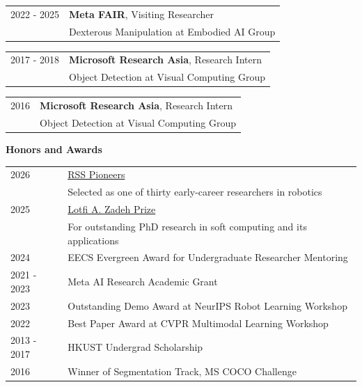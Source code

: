 \documentclass{resume}
\newlength{\myvertspace}
\newcommand{\vs}{ \vspace{\myvertspace} }
\begin{document}
{\renewcommand{\arraystretch}{1.1}
\begin{tabular}{@{}L{2.1cm}l@{}}
{2022 - 2025} & {\bf Meta FAIR}, Visiting Researcher \\
& {Dexterous Manipulation at Embodied AI Group} \\
\end{tabular}}

{\renewcommand{\arraystretch}{1.1}
\begin{tabular}{@{}L{2.1cm}l@{}}
{2017 - 2018} & {\bf Microsoft Research Asia}, Research Intern \\
& {Object Detection at Visual Computing Group}
\end{tabular}}

{\renewcommand{\arraystretch}{1.1}
\begin{tabular}{@{}L{2.1cm}l@{}}
{2016} & {\bf Microsoft Research Asia}, Research Intern \\
& {Object Detection at Visual Computing Group}
\end{tabular}}

\vs
{\bf \large Honors and Awards}
\vs

{\renewcommand{\arraystretch}{1.1}
\begin{tabular}{@{}L{2.1cm}p{13.1cm}@{}}
{2026} & {\href{https://sites.google.com/view/rsspioneers2026/}{RSS Pioneers}} \\ %
[-0.02cm]
& {Selected as one of thirty early-career researchers in robotics} \\
{2025} & {\href{https://www2.eecs.berkeley.edu/Students/Awards/146/}{Lotfi A. Zadeh Prize}} \\
[-0.02cm]
& {For outstanding PhD research in soft computing and its applications} \\
{2024} & {EECS Evergreen Award for Undergraduate Researcher Mentoring} \\
{2021 - 2023} & {Meta AI Research Academic Grant} \\
{2023} & {Outstanding Demo Award at NeurIPS Robot Learning Workshop} \\
{2022} & {Best Paper Award at CVPR Multimodal Learning Workshop} \\
{2013 - 2017} & {HKUST Undergrad Scholarship} \\ 
{2016} & {Winner of Segmentation Track, MS COCO Challenge}
\end{tabular}}
\end{document}
